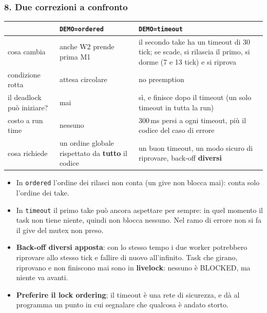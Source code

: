 \subsubsection*{8. Due correzioni a confronto}
\begin{center}
\small
\begin{tabular}{P{0.22} P{0.32} P{0.36}}
    \hline
    & \texttt{DEMO=ordered} & \texttt{DEMO=timeout} \\
    \hline
    cosa cambia & anche W2 prende prima M1 & il secondo take ha un timeout di 30 tick; se scade, si rilascia il primo, si dorme (7 e 13 tick) e si riprova \\
    condizione rotta & attesa circolare & no preemption \\
    il deadlock può iniziare? & mai & sì, e finisce dopo il timeout (un solo timeout in tutta la run) \\
    costo a run time & nessuno & 300\,ms persi a ogni timeout, più il codice del caso di errore \\
    cosa richiede & un ordine globale rispettato da \textbf{tutto} il codice & un buon timeout, un modo sicuro di riprovare, back-off \textbf{diversi} \\
    \hline
\end{tabular}
\end{center}
\begin{itemize}
    \item In \texttt{ordered} l'ordine dei rilasci non conta (un give non blocca mai): conta solo l'ordine dei take.
    \item In \texttt{timeout} il primo take può ancora aspettare per sempre: in quel momento il task non tiene niente, quindi non blocca nessuno. Nel ramo di errore non si fa il give del mutex non preso.
    \item \textbf{Back-off diversi apposta}: con lo stesso tempo i due worker potrebbero riprovare allo stesso tick e fallire di nuovo all'infinito. Task che girano, riprovano e non finiscono mai sono in \textbf{livelock}: nessuno è BLOCKED, ma niente va avanti.
    \item \textbf{Preferire il lock ordering}; il timeout è una rete di sicurezza, e dà al programma un punto in cui segnalare che qualcosa è andato storto.
\end{itemize}


